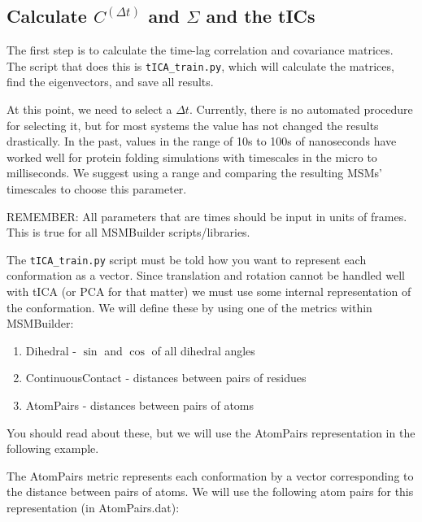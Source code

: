 \documentclass[12pt]{article}
\begin{document}
\subsection{Calculate $C^{(\Delta t)}$ and $\Sigma$ and the tICs}

The first step is to calculate the time-lag correlation and covariance matrices. The script that does this is \texttt{tICA\_train.py}, which will calculate the matrices, find the eigenvectors, and save all results.

At this point, we need to select a $\Delta t$. Currently, there is no automated procedure for selecting it, but for most systems the value has not changed the results drastically. In the past, values in the range of 10s to 100s of nanoseconds have worked well for protein folding simulations with timescales in the micro to milliseconds. We suggest using a range and comparing the resulting MSMs' timescales to choose this parameter.

REMEMBER: All parameters that are times should be input in units of frames. This is true for all MSMBuilder scripts/libraries.

The \texttt{tICA\_train.py} script must be told how you want to represent each conformation as a vector. Since translation and rotation cannot be handled well with tICA (or PCA for that matter) we must use some internal representation of the conformation. We will define these by using one of the metrics within MSMBuilder:
\begin{enumerate}
\item Dihedral - $\sin$ and $\cos$ of all dihedral angles 
\item ContinuousContact - distances between pairs of residues
\item AtomPairs - distances between pairs of atoms
\end{enumerate} You should read about these, but we will use the AtomPairs representation in the following example.

The AtomPairs metric represents each conformation by a vector corresponding to the distance between pairs of atoms. We will use the following atom pairs for this representation (in AtomPairs.dat):
\end{document}
